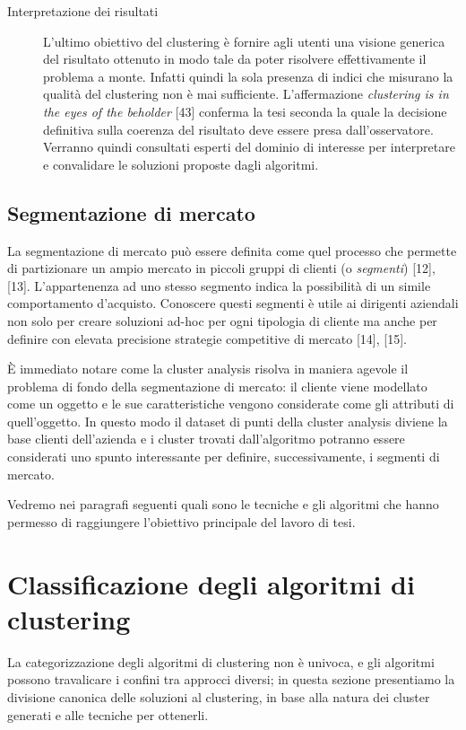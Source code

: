 \begin{description}
\item[Interpretazione dei risultati] L'ultimo obiettivo del clustering \`e fornire agli utenti una visione generica del risultato ottenuto in modo tale da poter risolvere effettivamente il problema a monte. Infatti quindi la sola presenza di indici che misurano la qualit\`a del clustering non \`e mai sufficiente. L'affermazione \textit{clustering is in the eyes of the beholder} [43] conferma la tesi seconda la quale la decisione definitiva sulla coerenza del risultato deve essere presa dall'osservatore. Verranno quindi consultati esperti del dominio di interesse per interpretare e convalidare le soluzioni proposte dagli algoritmi.
\end{description}

\subsection{Segmentazione di mercato}
La segmentazione di mercato pu\`o essere definita come quel processo che permette di partizionare un ampio mercato in piccoli gruppi di clienti (o \textit{segmenti}) [12], [13]. L'appartenenza ad uno stesso segmento indica la possibilit\`a di un simile comportamento d'acquisto. Conoscere questi segmenti \`e utile ai dirigenti aziendali non solo per creare soluzioni ad-hoc per ogni tipologia di cliente ma anche per definire con elevata precisione strategie competitive di mercato [14], [15].

\`E immediato notare come la cluster analysis risolva in maniera agevole il problema di fondo della segmentazione di mercato: il cliente viene modellato come un oggetto e le sue caratteristiche vengono considerate come gli attributi di quell'oggetto. In questo modo il dataset di punti della cluster analysis diviene la base clienti dell'azienda e i cluster trovati dall'algoritmo potranno essere considerati uno spunto interessante per definire, successivamente, i segmenti di mercato.

Vedremo nei paragrafi seguenti quali sono le tecniche e gli algoritmi che hanno permesso di raggiungere l'obiettivo principale del lavoro di tesi.

\section{Classificazione degli algoritmi di clustering}
La categorizzazione degli algoritmi di clustering non \`e univoca, e gli algoritmi possono travalicare i confini tra approcci diversi; in questa sezione presentiamo la divisione canonica delle soluzioni al clustering, in base alla natura dei cluster generati e alle tecniche per ottenerli.
